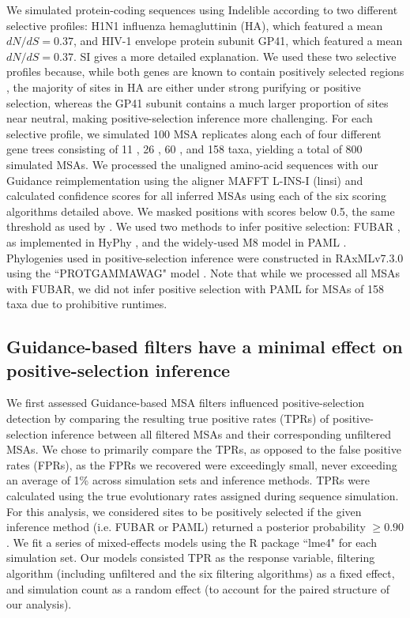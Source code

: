 \documentclass[11pt]{article}
\begin{document}
We simulated protein-coding sequences using Indelible \citep{Fletcher2009} according to two different selective profiles: H1N1 influenza hemagluttinin (HA), which featured a mean $dN/dS = 0.37$, and HIV-1 envelope protein subunit GP41, which featured a mean $dN/dS = 0.37$. SI gives a more detailed explanation. We used these two selective profiles because, while both genes are known to contain positively selected regions \citep{Bush1999, Frost2001, Bandawe2008, Meyer2012}, the majority of sites in HA are either under strong purifying or positive selection, whereas the GP41 subunit contains a much larger proportion of sites near neutral, making positive-selection inference more challenging. For each selective profile, we simulated 100 MSA replicates along each of four different gene trees consisting of 11 \citep{Spielman2013}, 26 \citep{Spielman2013}, 60 \citep{Yang2011}, and 158 \citep{Betancur2013} taxa, yielding a total of 800 simulated MSAs. We processed the unaligned amino-acid sequences with our Guidance reimplementation using the aligner MAFFT L-INS-I (linsi) \citep{Katoh2002,Katoh2005} and calculated confidence scores for all inferred MSAs using each of the six scoring algorithms detailed above. We masked positions with scores below 0.5, the same threshold as used by \citet{Jordan2012}. We used two methods to infer positive selection: FUBAR \citep{Murrell2013}, as implemented in HyPhy \citep{Pond2005}, and the widely-used M8 model in PAML \citep{Yang2000, Yang2007}. Phylogenies used in positive-selection inference were constructed in RAxMLv7.3.0 using the ``PROTGAMMAWAG" model \citep{Stamatakis2006}.  Note that while we processed all MSAs with FUBAR, we did not infer positive selection with PAML for MSAs of 158 taxa due to prohibitive runtimes.

\subsection*{Guidance-based filters have a minimal effect on positive-selection inference}

We first assessed Guidance-based MSA filters influenced positive-selection detection by comparing the resulting true positive rates (TPRs) of positive-selection inference between all filtered MSAs and their corresponding unfiltered MSAs.  We chose to primarily compare the TPRs, as opposed to the false positive rates (FPRs), as the FPRs we recovered were exceedingly small, never exceeding an average of 1\% across simulation sets and inference methods. TPRs were calculated using the true evolutionary rates assigned during sequence simulation. For this analysis, we considered sites to be positively selected if the given inference method (i.e. FUBAR or PAML) returned a posterior probability $\geq0.90$. We fit a series of mixed-effects models using the R package ``lme4" \citep{Bates2012} for each simulation set. Our models consisted TPR as the response variable, filtering algorithm (including unfiltered and the six filtering algorithms) as a fixed effect, and simulation count as a random effect (to account for the paired structure of our analysis). 
\end{document}
